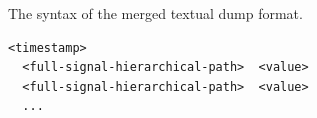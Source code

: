 
\begin{listing}[ht]
    \caption{The syntax of the merged textual dump format.}
    \label{listing:merged-syntax}
    \centering
    \begin{minipage}{0.6\textwidth}
        \begin{verbatim}
<timestamp>
  <full-signal-hierarchical-path>  <value>
  <full-signal-hierarchical-path>  <value>
  ...
            \end{verbatim}
    \end{minipage}
\end{listing}


